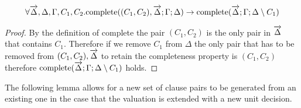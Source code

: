 \begin{mylemma}\label{lem:comprem}
\begin{align*}
\forall \overrightarrow{\Delta},\Delta,\Gamma,C_1,C_2. \mathrm{complete}((C_1, C_2), \overrightarrow{\Delta};\Gamma; \Delta) \to \mathrm{complete}(\overrightarrow{\Delta};\Gamma; \Delta \setminus C_1)
\end{align*}
\begin{proof}
By the definition of complete the pair $(C_1, C_2)$ is the only pair in $\overrightarrow{\Delta}$ that contains $C_1$.  Therefore if we remove $C_1$ from $\Delta$ the only pair that has to be removed from $(C_1, C_2), \overrightarrow{\Delta}$ to retain the completeness property is $(C_1,C_2)$ therefore $\mathrm{complete}(\overrightarrow{\Delta};\Gamma; \Delta \setminus C_1)$ holds.
\end{proof}
\end{mylemma}

The following lemma allows for a new set of clause pairs to be generated from an existing one in the case that the valuation is extended with a new unit decision.

